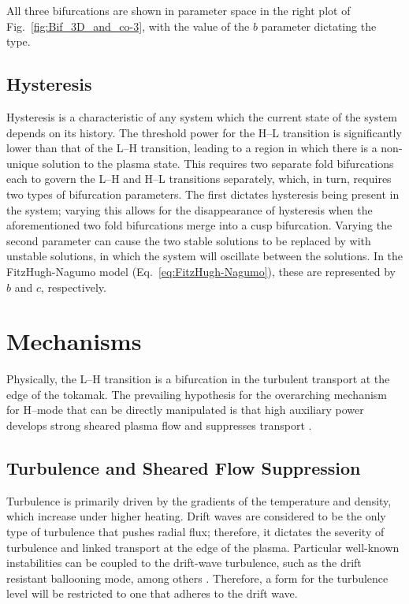 All three bifurcations are shown in parameter space in the right plot of Fig.~\ref{fig:Bif_3D_and_co-3}, with the value of the $b$ parameter dictating the type.

\subsection{Hysteresis}\label{ssec:hysteresis}
Hysteresis is a characteristic of any system which the current state of the system depends on its history.
The threshold power for the H--L transition is significantly lower than that of the L--H transition, leading to a region in which there is a non-unique solution to the plasma state.
This requires two separate fold bifurcations each to govern the L--H and H--L transitions separately, which, in turn, requires two types of bifurcation parameters.
The first dictates hysteresis being present in the system; varying this allows for the disappearance of hysteresis when the aforementioned two fold bifurcations merge into a cusp bifurcation.
Varying the second parameter can cause the two stable solutions to be replaced by with unstable solutions, in which the system will oscillate between the solutions.
In the FitzHugh-Nagumo model (Eq.~\ref{eq:FitzHugh-Nagumo}), these are represented by $b$ and $c$, respectively.
\todo{\color{red}{What to do here?}}

\section{Mechanisms}\label{sec:mechanics}
Physically, the L--H transition is a bifurcation in the turbulent transport at the edge of the tokamak.
The prevailing hypothesis for the overarching mechanism for H--mode that can be directly manipulated is that high auxiliary power develops strong sheared plasma flow and suppresses transport \cite{freidberg_plasma_2007}.

\subsection{Turbulence and Sheared Flow Suppression}\label{ssec:turbulence_sheared}
Turbulence is primarily driven by the gradients of the temperature and density, which increase under higher heating.
Drift waves are considered to be the only type of turbulence that pushes radial flux; therefore, it dictates the severity of turbulence and linked transport at the edge of the plasma.
Particular well-known instabilities can be coupled to the drift-wave turbulence, such as the drift resistant ballooning mode, among others \cite{scott_three-dimensional_1997}.
Therefore, a form for the turbulence level will be restricted to one that adheres to the drift wave.

